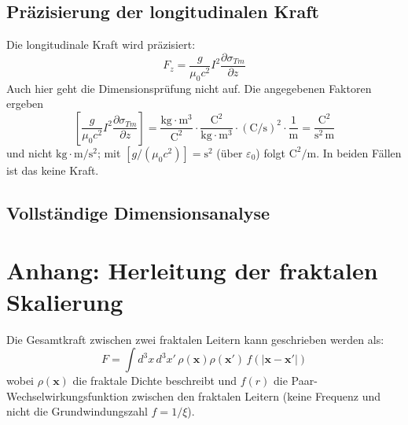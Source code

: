 	\subsection{Präzisierung der longitudinalen Kraft}
	Die longitudinale Kraft wird präzisiert:
	\begin{equation}
		F_z = \frac{g}{\mu_0 c^2} I^2 \frac{\partial \sigma_{Tm}}{\partial z} \label{eq:long_force_final}
	\end{equation}
	Auch hier geht die Dimensionsprüfung nicht auf. Die angegebenen Faktoren ergeben
	\begin{equation}
		\left[\frac{g}{\mu_0 c^2} I^2 \frac{\partial \sigma_{Tm}}{\partial z}\right] = \frac{\text{kg} \cdot \text{m}^3}{\text{C}^2} \cdot \frac{\text{C}^2}{\text{kg} \cdot \text{m}^3} \cdot (\text{C}/\text{s})^2 \cdot \frac{1}{\text{m}} = \frac{\text{C}^2}{\text{s}^2\,\text{m}}
	\end{equation}
	und nicht $\text{kg}\cdot\text{m}/\text{s}^2$; mit $[g/(\mu_0 c^2)] = \text{s}^2$ (über $\varepsilon_0$) folgt $\text{C}^2/\text{m}$. In beiden Fällen ist das keine Kraft.
	
	\subsection{Vollständige Dimensionsanalyse}
	\begin{table}[h]
		\centering
		\caption{Dimensionsdefinitionen im T0-Modell}
		\label{tab:dimensions}
	\end{table}
	
	\section*{Anhang: Herleitung der fraktalen Skalierung}
	Die Gesamtkraft zwischen zwei fraktalen Leitern kann geschrieben werden als:
	\begin{equation}
		F = \int d^3x \, d^3x' \, \rho(\mathbf{x}) \rho(\mathbf{x}') \, f(|\mathbf{x}-\mathbf{x}'|)
	\end{equation}
	wobei $\rho(\mathbf{x})$ die fraktale Dichte beschreibt und $f(r)$ die Paar-Wechselwirkungsfunktion zwischen den fraktalen Leitern (keine Frequenz und nicht die Grundwindungszahl $f = 1/\xi$).

